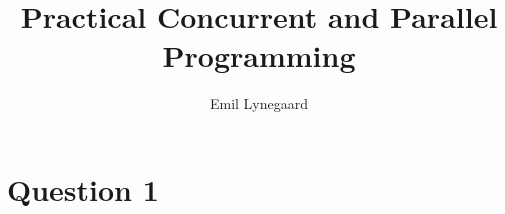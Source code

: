 \documentclass[a5paper]{article}
\title{Practical Concurrent and Parallel Programming}
\author{Emil Lynegaard}
\begin{document}
  
  \maketitle
  \section{Question 1}
\end{document}
